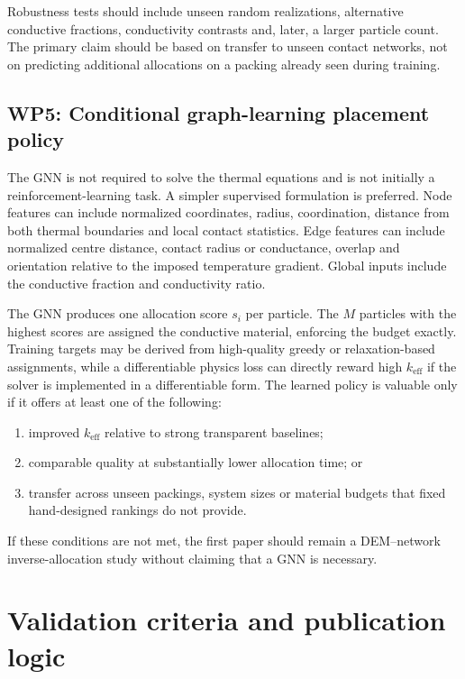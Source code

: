 \documentclass[12pt,a4paper]{article}
\begin{document}
Robustness tests should include unseen random realizations, alternative
conductive fractions, conductivity contrasts and, later, a larger particle
count. The primary claim should be based on transfer to unseen contact networks,
not on predicting additional allocations on a packing already seen during
training.

\subsection*{WP5: Conditional graph-learning placement policy}

The GNN is not required to solve the thermal equations and is not initially a
reinforcement-learning task. A simpler supervised formulation is preferred.
Node features can include normalized coordinates, radius, coordination,
distance from both thermal boundaries and local contact statistics. Edge
features can include normalized centre distance, contact radius or conductance,
overlap and orientation relative to the imposed temperature gradient. Global
inputs include the conductive fraction and conductivity ratio.

The GNN produces one allocation score $s_i$ per particle. The $M$ particles
with the highest scores are assigned the conductive material, enforcing the
budget exactly. Training targets may be derived from high-quality greedy or
relaxation-based assignments, while a differentiable physics loss can directly
reward high $k_{\mathrm{eff}}$ if the solver is implemented in a differentiable
form. The learned policy is valuable only if it offers at least one of the
following:
\begin{enumerate}
    \item improved $k_{\mathrm{eff}}$ relative to strong transparent baselines;
    \item comparable quality at substantially lower allocation time; or
    \item transfer across unseen packings, system sizes or material budgets
    that fixed hand-designed rankings do not provide.
\end{enumerate}
If these conditions are not met, the first paper should remain a DEM--network
inverse-allocation study without claiming that a GNN is necessary.

\section{Validation criteria and publication logic}
\end{document}
